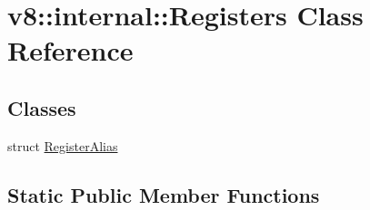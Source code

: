 \hypertarget{classv8_1_1internal_1_1_registers}{}\section{v8\+:\+:internal\+:\+:Registers Class Reference}
\label{classv8_1_1internal_1_1_registers}
\subsection*{Classes}
\begin{DoxyCompactItemize}
\item 
struct \hyperlink{structv8_1_1internal_1_1_registers_1_1_register_alias}{Register\+Alias}
\end{DoxyCompactItemize}
\subsection*{Static Public Member Functions}
